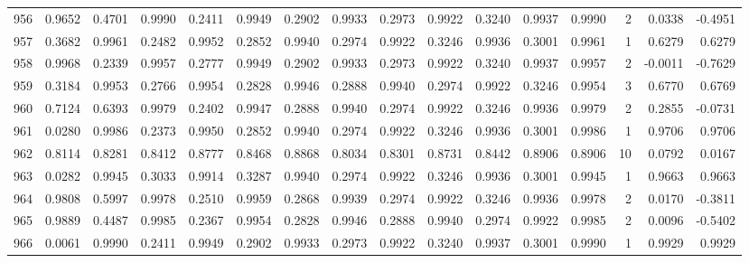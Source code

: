 \begin{tabular}{lrrrrrrrrrrrrrrr}
956 &      0.9652 &  0.4701 &  0.9990 &  0.2411 &  0.9949 &  0.2902 &  0.9933 &  0.2973 &  0.9922 &  0.3240 &   0.9937 &     0.9990 &      2 &                    0.0338 &                    -0.4951 \\
957 &      0.3682 &  0.9961 &  0.2482 &  0.9952 &  0.2852 &  0.9940 &  0.2974 &  0.9922 &  0.3246 &  0.9936 &   0.3001 &     0.9961 &      1 &                    0.6279 &                     0.6279 \\
958 &      0.9968 &  0.2339 &  0.9957 &  0.2777 &  0.9949 &  0.2902 &  0.9933 &  0.2973 &  0.9922 &  0.3240 &   0.9937 &     0.9957 &      2 &                   -0.0011 &                    -0.7629 \\
959 &      0.3184 &  0.9953 &  0.2766 &  0.9954 &  0.2828 &  0.9946 &  0.2888 &  0.9940 &  0.2974 &  0.9922 &   0.3246 &     0.9954 &      3 &                    0.6770 &                     0.6769 \\
960 &      0.7124 &  0.6393 &  0.9979 &  0.2402 &  0.9947 &  0.2888 &  0.9940 &  0.2974 &  0.9922 &  0.3246 &   0.9936 &     0.9979 &      2 &                    0.2855 &                    -0.0731 \\
961 &      0.0280 &  0.9986 &  0.2373 &  0.9950 &  0.2852 &  0.9940 &  0.2974 &  0.9922 &  0.3246 &  0.9936 &   0.3001 &     0.9986 &      1 &                    0.9706 &                     0.9706 \\
962 &      0.8114 &  0.8281 &  0.8412 &  0.8777 &  0.8468 &  0.8868 &  0.8034 &  0.8301 &  0.8731 &  0.8442 &   0.8906 &     0.8906 &     10 &                    0.0792 &                     0.0167 \\
963 &      0.0282 &  0.9945 &  0.3033 &  0.9914 &  0.3287 &  0.9940 &  0.2974 &  0.9922 &  0.3246 &  0.9936 &   0.3001 &     0.9945 &      1 &                    0.9663 &                     0.9663 \\
964 &      0.9808 &  0.5997 &  0.9978 &  0.2510 &  0.9959 &  0.2868 &  0.9939 &  0.2974 &  0.9922 &  0.3246 &   0.9936 &     0.9978 &      2 &                    0.0170 &                    -0.3811 \\
965 &      0.9889 &  0.4487 &  0.9985 &  0.2367 &  0.9954 &  0.2828 &  0.9946 &  0.2888 &  0.9940 &  0.2974 &   0.9922 &     0.9985 &      2 &                    0.0096 &                    -0.5402 \\
966 &      0.0061 &  0.9990 &  0.2411 &  0.9949 &  0.2902 &  0.9933 &  0.2973 &  0.9922 &  0.3240 &  0.9937 &   0.3001 &     0.9990 &      1 &                    0.9929 &                     0.9929 \\

\end{tabular}
